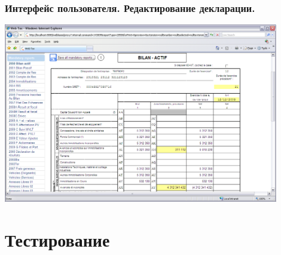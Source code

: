 \documentclass[xcolor=pdftex, dvipsnames, table]{beamer}
\begin{document}
\begin{frame}
  \frametitle{Интерфейс пользователя. Редактирование декларации.}
  \begin{center}
    \includegraphics[width=0.9\textwidth]{pics/src_reportnice}
  \end{center}
\end{frame}


\section{Тестирование}
\end{document}
